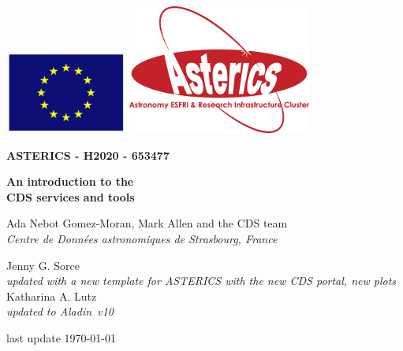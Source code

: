 \documentclass [a4paper, 12pt]{article}
\newcommand{\aladin}{{\textsc{A}{ladin}}}
\begin{document}
\begin{center}\includegraphics[width=0.3\textwidth]{../images/logo_euro.png} 
\hspace{5cm}\includegraphics[width=0.4 
\textwidth]{../images/logo_asterics.png}\\
\vspace{1.5cm}
\begin{Huge} \textbf{ASTERICS - H2020 - 653477} \end{Huge} \end{center}


\vspace{1cm}
\Huge
\begin{center}
\bf An introduction to the \\ CDS services and tools\\
\end{center}


\vspace{1cm}
\large
\begin{center}
Ada Nebot Gomez-Moran, Mark Allen and the CDS team\\
\textit{Centre de Donn\'ees astronomiques de Strasbourg, France}
\end{center}
\vspace{0.5cm}
\begin{center}
Jenny G. Sorce\\
\textit{updated with a new template for ASTERICS with the new CDS 
portal, new 
plots}\\
\vspace{0.5cm}
Katharina A. Lutz\\
\textit{updated to \aladin\ v10}
\end{center}
\vspace{0.5cm}
\begin{center}
last update \today
\end{center}
\end{document}
